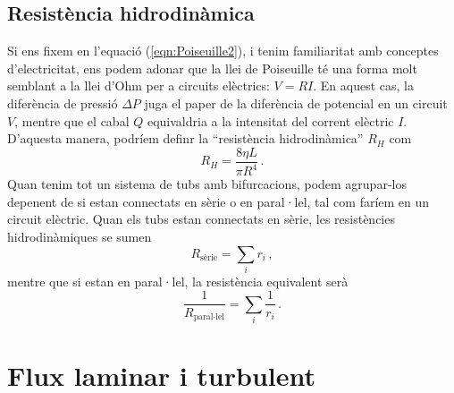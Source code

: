 \documentclass[12pt]{book}
\begin{document}
\subsection{Resistència hidrodinàmica}

Si ens fixem en l'equació (\ref{eqn:Poiseuille2}), i tenim familiaritat amb conceptes d'electricitat, ens podem adonar que la llei de Poiseuille té una forma molt semblant a la llei d'Ohm per a circuits elèctrics: $V = RI$. En aquest cas, la diferència de pressió $\Delta P$ juga el paper de la diferència de potencial en un circuit $V$, mentre que el cabal $Q$ equivaldria a la intensitat del corrent elèctric $I$. D'aquesta manera, podríem definr la ``resistència hidrodinàmica'' $R_H$ com 
%
\begin{equation}
    R_H = \frac{8 \eta L}{\pi R^4} \, .
    \label{eqn:ResistenciaHidrodinamica}
\end{equation}
%
Quan tenim tot un sistema de tubs amb bifurcacions, podem agrupar-los depenent de si estan connectats en sèrie o en paral·lel, tal com faríem en un circuit elèctric. Quan els tubs estan connectats en sèrie, les resistències hidrodinàmiques se sumen 
%
\begin{equation}
    R_\text{sèrie} = \sum_i r_i \, ,
    \label{eqn:EnSerie}
\end{equation}
%
mentre que si estan en paral·lel, la resistència equivalent serà
%
\begin{equation}
    \frac{1}{R_\text{paral·lel}} = \sum_i \frac{1}{r_i} \, .
    \label{eqn:EnParallel}
\end{equation}
%

\section{Flux laminar i turbulent}
\end{document}
